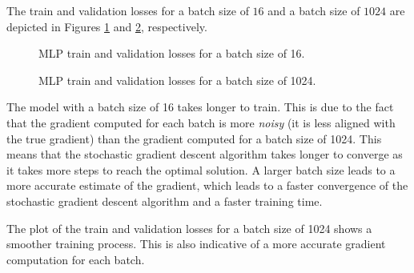 \documentclass[12pt]{article}
\begin{document}
\begin{enumerate}[leftmargin=\labelsep]
\begin{enumerate}[label=\alph*)]
                    The train and validation losses for a batch size of $16$ and a batch size of $1024$ are depicted in Figures \ref{fig:q2-mlp-training-loss-batch-16-lr-0.1-epochs-20-hidden-200-dropout-0.0-l2-0.0-layers-2-act-relu-opt-sgd} and \ref{fig:q2-mlp-training-loss-batch-1024-lr-0.1-epochs-20-hidden-200-dropout-0.0-l2-0.0-layers-2-act-relu-opt-sgd}, respectively.

                    \begin{figure}[H]
                        \centering
                        
                        \caption{MLP train and validation losses for a batch size of 16.}
                        \label{fig:q2-mlp-training-loss-batch-16-lr-0.1-epochs-20-hidden-200-dropout-0.0-l2-0.0-layers-2-act-relu-opt-sgd}
                    \end{figure}

                    \begin{figure}[H]
                        \centering
                        
                        \caption{MLP train and validation losses for a batch size of 1024.}
                        \label{fig:q2-mlp-training-loss-batch-1024-lr-0.1-epochs-20-hidden-200-dropout-0.0-l2-0.0-layers-2-act-relu-opt-sgd}
                    \end{figure}

                    The model with a batch size of 16 takes longer to train. This is due to the fact that the gradient computed for each batch is more \textit{noisy} (it is less aligned with the true gradient) than the gradient computed for a batch size of 1024. This means that the stochastic gradient descent algorithm takes longer to converge as it takes more steps to reach the optimal solution. A larger batch size leads to a more accurate estimate of the gradient, which leads to a faster convergence of the stochastic gradient descent algorithm and a faster training time.

                    The plot of the train and validation losses for a batch size of 1024 shows a smoother training process. This is also indicative of a more accurate gradient computation for each batch.

                    \vspace{12pt}


\end{enumerate}
\end{enumerate}
\end{document}
